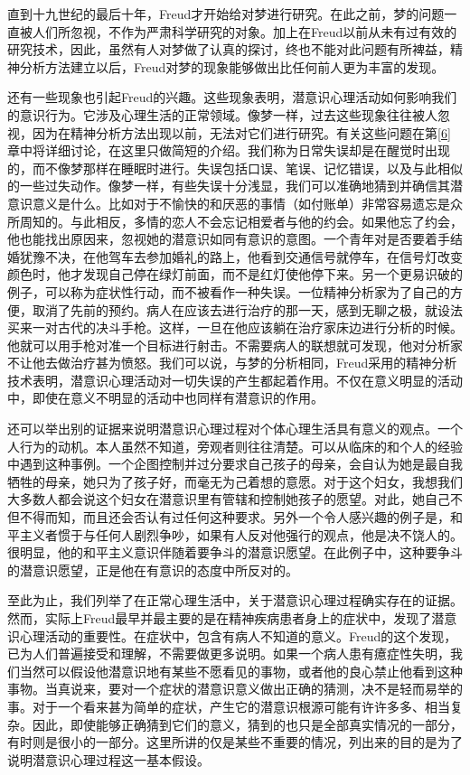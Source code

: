 \documentclass[UTF8,10pt,a4paper,openany]{book}
\begin{document}
直到十九世纪的最后十年，Freud才开始给对梦进行研究。在此之前，梦的问题一直被人们所忽视，不作为严肃科学研究的对象。加上在Freud以前从未有过有效的研究技术，因此，虽然有人对梦做了认真的探讨，终也不能对此问题有所裨益，精神分析方法建立以后，Freud对梦的现象能够做出比任何前人更为丰富的发现。

还有一些现象也引起Freud的兴趣。这些现象表明，潜意识心理活动如何影响我们的意识行为。它涉及心理生活的正常领域。像梦一样，过去这些现象往往被人忽视，因为在精神分析方法出现以前，无法对它们进行研究。有关这些问题在第\ref{6}章中将详细讨论，在这里只做简短的介绍。我们称为日常失误却是在醒觉时出现的，而不像梦那样在睡眠时进行。失误包括口误、笔误、记忆错误，以及与此相似的一些过失动作。像梦一样，有些失误十分浅显，我们可以准确地猜到并确信其潜意识意义是什么。比如对于不愉快的和厌恶的事情（如付账单）非常容易遗忘是众所周知的。与此相反，多情的恋人不会忘记相爱者与他的约会。如果他忘了约会，他也能找出原因来，忽视她的潜意识如同有意识的意图。一个青年对是否要着手结婚犹豫不决，在他驾车去参加婚礼的路上，他看到交通信号就停车，在信号灯改变颜色时，他才发现自己停在绿灯前面，而不是红灯使他停下来。另一个更易识破的例子，可以称为症状性行动，而不被看作一种失误。一位精神分析家为了自己的方便，取消了先前的预约。病人在应该去进行治疗的那一天，感到无聊之极，就设法买来一对古代的决斗手枪。这样，一旦在他应该躺在治疗家床边进行分析的时候。他就可以用手枪对准一个目标进行射击。不需要病人的联想就可发现，他对分析家不让他去做治疗甚为愤怒。我们可以说，与梦的分析相同，Freud采用的精神分析技术表明，潜意识心理活动对一切失误的产生都起着作用。不仅在意义明显的活动中，即使在意义不明显的活动中也同样有潜意识的作用。

还可以举出别的证据来说明潜意识心理过程对个体心理生活具有意义的观点。一个人行为的动机。本人虽然不知道，旁观者则往往清楚。可以从临床的和个人的经验中遇到这种事例。一个企图控制并过分要求自己孩子的母亲，会自认为她是最自我牺牲的母亲，她只为了孩子好，而毫无为己着想的意愿。对于这个妇女，我想我们大多数人都会说这个妇女在潜意识里有管辖和控制她孩子的愿望。对此，她自己不但不得而知，而且还会否认有过任何这种要求。另外一个令人感兴趣的例子是，和平主义者惯于与任何人剧烈争吵，如果有人反对他强行的观点，他是决不饶人的。很明显，他的和平主义意识伴随着要争斗的潜意识愿望。在此例子中，这种要争斗的潜意识愿望，正是他在有意识的态度中所反对的。

至此为止，我们列举了在正常心理生活中，关于潜意识心理过程确实存在的证据。然而，实际上Freud最早并最主要的是在精神疾病患者身上的症状中，发现了潜意识心理活动的重要性。在症状中，包含有病人不知道的意义。Freud的这个发现，已为人们普遍接受和理解，不需要做更多说明。如果一个病人患有癔症性失明，我们当然可以假设他潜意识地有某些不愿看见的事物，或者他的良心禁止他看到这种事物。当真说来，要对一个症状的潜意识意义做出正确的猜测，决不是轻而易举的事。对于一个看来甚为简单的症状，产生它的潜意识根源可能有许许多多、相当复杂。因此，即使能够正确猜到它们的意义，猜到的也只是全部真实情况的一部分，有时则是很小的一部分。这里所讲的仅是某些不重要的情况，列出来的目的是为了说明潜意识心理过程这一基本假设。
\end{document}
